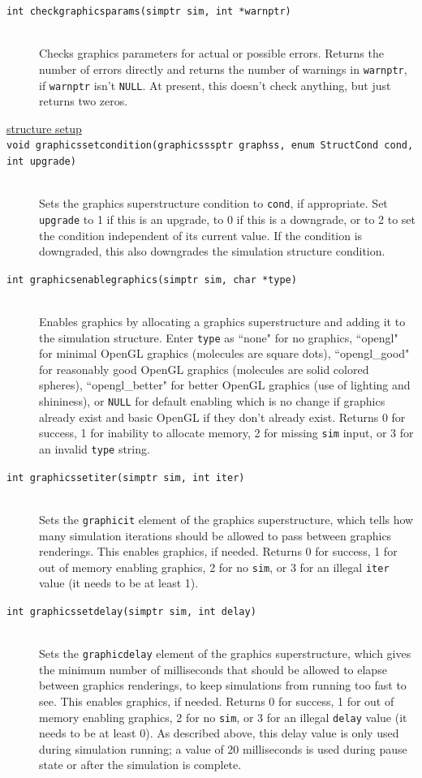 \documentclass {scrbook}
\newcommand {\ttt} {\texttt}
\begin{document}
\begin{description}
\item[\ttt{int checkgraphicsparams(simptr sim, int *warnptr)}]
\hfill \\
Checks graphics parameters for actual or possible errors. Returns the number of errors directly and returns the number of warnings in \ttt{warnptr}, if \ttt{warnptr} isn't \ttt{NULL}. At present, this doesn't check anything, but just returns two zeros.

\item[\underline{structure setup}]

\item[\ttt{void graphicssetcondition(graphicsssptr graphss, enum StructCond cond, int upgrade)}]
\hfill \\
Sets the graphics superstructure condition to \ttt{cond}, if appropriate. Set \ttt{upgrade} to 1 if this is an upgrade, to 0 if this is a downgrade, or to 2 to set the condition independent of its current value. If the condition is downgraded, this also downgrades the simulation structure condition.

\item[\ttt{int graphicsenablegraphics(simptr sim, char *type)}]
\hfill \\
Enables graphics by allocating a graphics superstructure and adding it to the simulation structure. Enter \ttt{type} as ``none" for no graphics, ``opengl" for minimal OpenGL graphics (molecules are square dots), ``opengl\_good" for reasonably good OpenGL graphics (molecules are solid colored spheres), ``opengl\_better" for better OpenGL graphics (use of lighting and shininess), or \ttt{NULL} for default enabling which is no change if graphics already exist and basic OpenGL if they don't already exist. Returns 0 for success, 1 for inability to allocate memory, 2 for missing \ttt{sim} input, or 3 for an invalid \ttt{type} string.

\item[\ttt{int graphicssetiter(simptr sim, int iter)}]
\hfill \\
Sets the \ttt{graphicit} element of the graphics superstructure, which tells how many simulation iterations should be allowed to pass between graphics renderings. This enables graphics, if needed. Returns 0 for success, 1 for out of memory enabling graphics, 2 for no \ttt{sim}, or 3 for an illegal \ttt{iter} value (it needs to be at least 1).

\item[\ttt{int graphicssetdelay(simptr sim, int delay)}]
\hfill \\
Sets the \ttt{graphicdelay} element of the graphics superstructure, which gives the minimum number of milliseconds that should be allowed to elapse between graphics renderings, to keep simulations from running too fast to see. This enables graphics, if needed. Returns 0 for success, 1 for out of memory enabling graphics, 2 for no \ttt{sim}, or 3 for an illegal \ttt{delay} value (it needs to be at least 0). As described above, this delay value is only used during simulation running; a value of 20 milliseconds is used during pause state or after the simulation is complete.


\end{description}
\end{document}

